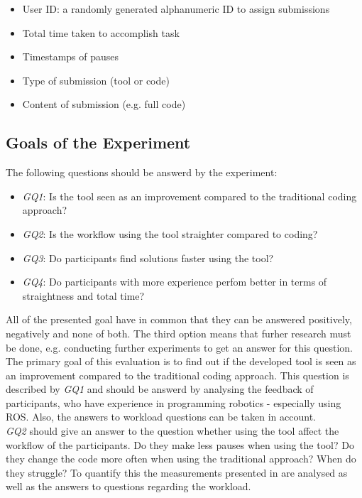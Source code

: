 \begin{itemize}
    \item User ID: a randomly generated alphanumeric ID to assign submissions
    \item Total time taken to accomplish task
    \item Timestamps of pauses
    \item Type of submission (tool or code)
    \item Content of submission (e.g. full code)
\end{itemize}

\subsection{Goals of the Experiment} \label{sub:ExperimentGoals}
The following questions should be answerd by the experiment:
\begin{itemize}
    \item \textit{GQ1}: Is the tool seen as an improvement compared to the traditional coding approach?
    \item \textit{GQ2}: Is the workflow using the tool straighter compared to coding?
    \item \textit{GQ3}: Do participants find solutions faster using the tool?
    \item \textit{GQ4}: Do participants with more experience perfom better in terms of straightness and total time?
\end{itemize}
All of the presented goal have in common that they can be answered positively, negatively and none of both. The third option means that furher research must be done, e.g. conducting further experiments to get an answer for this question. \\

The primary goal of this evaluation is to find out if the developed tool is seen as an improvement compared to the traditional coding approach. This question is described by \textit{GQ1} and should be answerd by analysing the feedback of participants, who have experience in programming robotics - especially using ROS. Also, the answers to workload questions can be taken in account. \\

\textit{GQ2} should give an answer to the question whether using the tool affect the workflow of the participants. Do they make less pauses when using the tool? Do they change the code more often when using the traditional approach? When do they struggle? To quantify this the measurements presented in  are analysed as well as the answers to questions regarding the workload. \\

